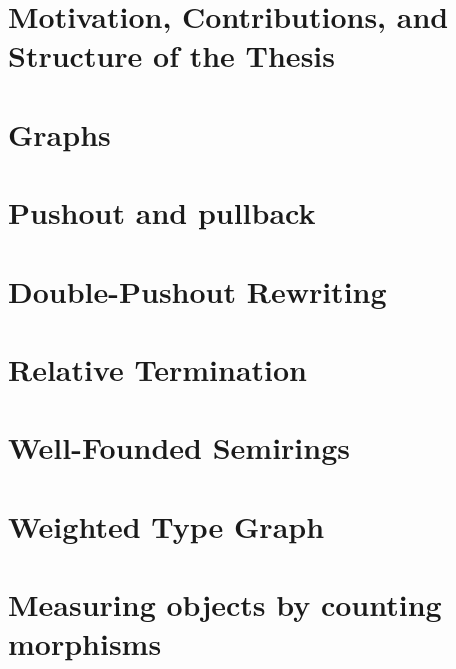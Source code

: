 \documentclass{report}
\begin{document}
\section{Motivation, Contributions, and Structure of the Thesis} 

\section{Graphs}
 
\section{Pushout and pullback}  

\section{Double-Pushout Rewriting}
 
\section{Relative Termination}



\section{Well-Founded Semirings} 
\label{sec:well_founded_semiring}

\section{Weighted Type Graph} 
\label{sec:weighted_type_graph}


%  
\section{Measuring objects by counting morphisms}
\label{sec:type_graph:measuring_graphs}



%  
  
\end{document}
